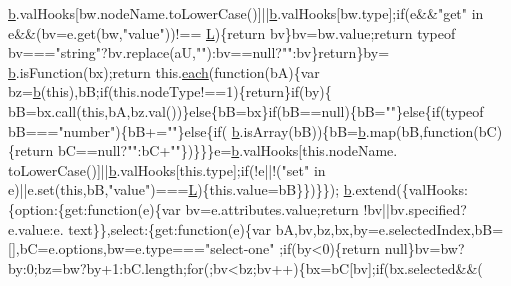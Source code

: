 \begin{DoxyCode}
      \hyperlink{a00039_aa4026ad5544b958e54ce5e106fa1c805}{b}.valHooks[bw.nodeName.toLowerCase()]||\hyperlink{a00039_aa4026ad5544b958e54ce5e106fa1c805}{b}.valHooks[bw.type];\textcolor{keywordflow}{if}(e&&\textcolor{stringliteral}{"get"} in e&&(bv=e.get(bw,\textcolor{stringliteral}{"value"}))!==
      \hyperlink{a00039_a38ee4c0b5f4fe2a18d0c783af540d253}{L})\{\textcolor{keywordflow}{return} bv\}bv=bw.value;\textcolor{keywordflow}{return} typeof bv===\textcolor{stringliteral}{"string"}?bv.replace(aU,\textcolor{stringliteral}{""}):bv==null?\textcolor{stringliteral}{""}:bv\}\textcolor{keywordflow}{return}\}by=
      \hyperlink{a00039_aa4026ad5544b958e54ce5e106fa1c805}{b}.isFunction(bx);\textcolor{keywordflow}{return} this.\hyperlink{a00039_a871ff39db627c54c710a3e9909b8234c}{each}(\textcolor{keyword}{function}(bA)\{var bz=\hyperlink{a00039_aa4026ad5544b958e54ce5e106fa1c805}{b}(\textcolor{keyword}{this}),bB;\textcolor{keywordflow}{if}(this.nodeType!==1)\{\textcolor{keywordflow}{return}\}\textcolor{keywordflow}{if}(by)\{
      bB=bx.call(\textcolor{keyword}{this},bA,bz.val())\}\textcolor{keywordflow}{else}\{bB=bx\}\textcolor{keywordflow}{if}(bB==null)\{bB=\textcolor{stringliteral}{""}\}\textcolor{keywordflow}{else}\{\textcolor{keywordflow}{if}(typeof bB===\textcolor{stringliteral}{"number"})\{bB+=\textcolor{stringliteral}{""}\}\textcolor{keywordflow}{else}\{\textcolor{keywordflow}{if}(
      \hyperlink{a00039_aa4026ad5544b958e54ce5e106fa1c805}{b}.isArray(bB))\{bB=\hyperlink{a00039_aa4026ad5544b958e54ce5e106fa1c805}{b}.map(bB,\textcolor{keyword}{function}(bC)\{\textcolor{keywordflow}{return} bC==null?\textcolor{stringliteral}{""}:bC+\textcolor{stringliteral}{""}\})\}\}\}e=\hyperlink{a00039_aa4026ad5544b958e54ce5e106fa1c805}{b}.valHooks[\textcolor{keyword}{this}.nodeName.
      toLowerCase()]||\hyperlink{a00039_aa4026ad5544b958e54ce5e106fa1c805}{b}.valHooks[this.type];\textcolor{keywordflow}{if}(!e||!(\textcolor{stringliteral}{"set"} in e)||e.set(\textcolor{keyword}{this},bB,\textcolor{stringliteral}{"value"})===\hyperlink{a00039_a38ee4c0b5f4fe2a18d0c783af540d253}{L})\{this.value=bB\}\})\}\});
      \hyperlink{a00039_aa4026ad5544b958e54ce5e106fa1c805}{b}.extend(\{valHooks:\{option:\{\textcolor{keyword}{get}:\textcolor{keyword}{function}(e)\{var bv=e.attributes.value;\textcolor{keywordflow}{return} !bv||bv.specified?e.value:e.
      text\}\},select:\{\textcolor{keyword}{get}:\textcolor{keyword}{function}(e)\{var bA,bv,bz,bx,by=e.selectedIndex,bB=[],bC=e.options,bw=e.type===\textcolor{stringliteral}{"select-one"}
      ;\textcolor{keywordflow}{if}(by<0)\{\textcolor{keywordflow}{return} null\}bv=bw?by:0;bz=bw?by+1:bC.length;\textcolor{keywordflow}{for}(;bv<bz;bv++)\{bx=bC[bv];\textcolor{keywordflow}{if}(bx.selected&&(

\end{DoxyCode}
